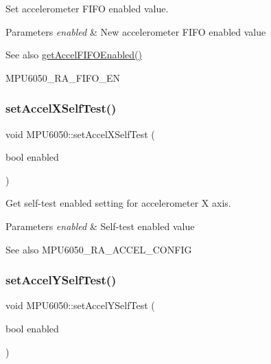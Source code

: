 Set accelerometer F\+I\+FO enabled value. 
\begin{DoxyParams}{Parameters}
{\em enabled} & New accelerometer F\+I\+FO enabled value \\
\hline
\end{DoxyParams}
\begin{DoxySeeAlso}{See also}
\mbox{\hyperlink{class_m_p_u6050_ace244415128ad7a38293ad6808b7face}{get\+Accel\+F\+I\+F\+O\+Enabled()}} 

M\+P\+U6050\+\_\+\+R\+A\+\_\+\+F\+I\+F\+O\+\_\+\+EN 
\end{DoxySeeAlso}
\mbox{\label{class_m_p_u6050_ac2ab843dc9d241056ed0f891195cdbf9}} 
\subsubsection{\texorpdfstring{setAccelXSelfTest()}{setAccelXSelfTest()}}
{\footnotesize\ttfamily void M\+P\+U6050\+::set\+Accel\+X\+Self\+Test (\begin{DoxyParamCaption}\item[{bool}]{enabled }\end{DoxyParamCaption})}

Get self-\/test enabled setting for accelerometer X axis. 
\begin{DoxyParams}{Parameters}
{\em enabled} & Self-\/test enabled value \\
\hline
\end{DoxyParams}
\begin{DoxySeeAlso}{See also}
M\+P\+U6050\+\_\+\+R\+A\+\_\+\+A\+C\+C\+E\+L\+\_\+\+C\+O\+N\+F\+IG 
\end{DoxySeeAlso}
\mbox{\label{class_m_p_u6050_ad5847430ab297959e4d0e9b81ba2e3ba}} 
\subsubsection{\texorpdfstring{setAccelYSelfTest()}{setAccelYSelfTest()}}
{\footnotesize\ttfamily void M\+P\+U6050\+::set\+Accel\+Y\+Self\+Test (\begin{DoxyParamCaption}\item[{bool}]{enabled }\end{DoxyParamCaption})}

